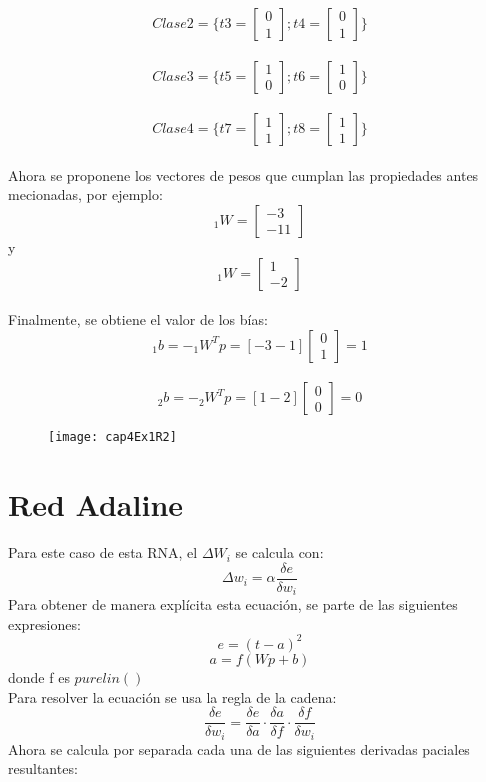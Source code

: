 \documentclass{article}
\begin{document}
\[Clase 2 = \{ t3 =
\begin{bmatrix}
0\\
1
\end{bmatrix};
t4 = 
\begin{bmatrix}
0\\
1
\end{bmatrix}
\}
\]\\

\[Clase 3 = \{ t5 =
\begin{bmatrix}
1\\
0
\end{bmatrix};
t6 = 
\begin{bmatrix}
1\\
0
\end{bmatrix}
\}
\]\\

\[Clase 4= \{ t7 =
\begin{bmatrix}
1\\
1
\end{bmatrix};
t8 = 
\begin{bmatrix}
1\\
1
\end{bmatrix}
\}
\]\\

Ahora se proponene los vectores de pesos que cumplan las propiedades antes mecionadas, por ejemplo:\\
\[_1W= 
\begin{bmatrix}
-3\\
-11
\end{bmatrix}
\]
 y 
 \[_1W= 
\begin{bmatrix}
1\\
-2
\end{bmatrix}
\]\\

Finalmente, se obtiene el valor de los bías:
\[_1b= -_1W^Tp=[-3 -1] 
\begin{bmatrix}
0\\
1
\end{bmatrix}=1
\]\\

\[_2b= -_2W^Tp=[1 -2] 
\begin{bmatrix}
0\\
0
\end{bmatrix}=0
\]
\begin{figure}[h!]
	\centering
	\texttt{[image: cap4Ex1R2]}
\end{figure}

\section{Red Adaline}
Para este caso de esta RNA, el $\Delta W_i$ se calcula con:
$$ \Delta w_i = \alpha \frac{\delta e}{\delta w_i} $$
Para obtener de manera explícita esta ecuación, se parte de las siguientes expresiones:
$$ e = (t - a)^2 $$
$$ a=f(Wp + b) $$
donde f es $purelin()$\\
Para resolver la ecuación se usa la regla de la cadena:
$$ \frac{\delta e}{\delta w_i} = \frac{\delta e}{\delta a} \cdot  \frac{\delta a}{\delta f} \cdot \frac{\delta f}{\delta w_i}$$ 
Ahora se calcula por separada cada una de las siguientes derivadas paciales resultantes:
\end{document}
